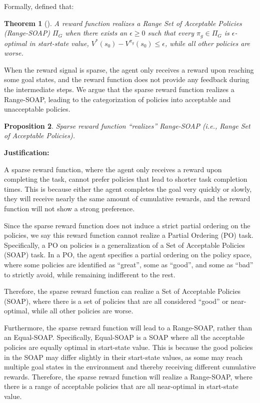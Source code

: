 \documentclass{article}
\theoremstyle{plain}
\newtheorem{theorem}{Theorem}[section]
\newtheorem{proposition}[theorem]{Proposition}
\theoremstyle{definition}
\theoremstyle{remark}
\begin{document}
Formally, \citet{Abel2021OnTE} defined that: 

\begin{theorem}[\citet{Abel2021OnTE}]
\label{theo:sparse_reward_range_soap}
A reward function realizes a Range Set of Acceptable Policies (Range-SOAP) $\Pi_G$ when there exists an $\epsilon \geq 0$ such that every $\pi_g \in \Pi_G$ is $\epsilon$-optimal in start-state value, $V^*(s_0) - V^{\pi_g}(s_0) \leq \epsilon$, while all other policies are worse. 
\end{theorem}

When the reward signal is sparse, the agent only receives a reward upon reaching some goal states, and the reward function does not provide any feedback during the intermediate steps. We argue that the sparse reward function realizes a Range-SOAP, leading to the categorization of policies into acceptable and unacceptable policies.

\begin{proposition}
    Sparse reward function ``realizes'' Range-SOAP (i.e., Range Set of Acceptable Policies). 
\end{proposition}


\noindent\textbf{Justification:}

A sparse reward function, where the agent only receives a reward upon completing the task, cannot prefer policies that lead to shorter task completion times. This is because either the agent completes the goal very quickly or slowly, they will receive nearly the same amount of cumulative rewards, and the reward function will not show a strong preference. 

Since the sparse reward function does not induce a strict partial ordering on the policies, we say this reward function cannot realize a Partial Ordering (PO) task. Specifically, a PO on policies is a generalization of a Set of Acceptable Policies (SOAP) task. In a PO, the agent specifies a partial ordering on the policy space, where some policies are identified as ``great'', some as ``good'', and some as ``bad'' to strictly avoid, while remaining indifferent to the rest. 

Therefore, the sparse reward function can realize a Set of Acceptable Policies (SOAP), where there is a set of policies that are all considered ``good'' or near-optimal, while all other policies are worse. 

Furthermore, the sparse reward function will lead to a Range-SOAP, rather than an Equal-SOAP. Specifically, Equal-SOAP is a SOAP where all the acceptable policies are equally optimal in start-state value. This is because the good policies in the SOAP may differ slightly in their start-state values, as some may reach multiple goal states in the environment and thereby receiving different cumulative rewards. Therefore, the sparse reward function will realize a Range-SOAP, where there is a range of acceptable policies that are all near-optimal in start-state value.
\end{document}
